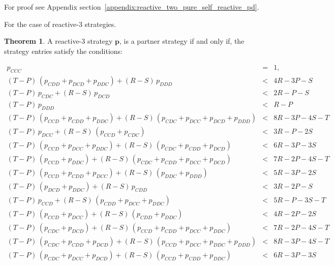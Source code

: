 \documentclass[11pt]{article}
\theoremstyle{definition}
\newtheorem{theorem}{Theorem}[section]
\begin{document}
For proof see Appendix section~\ref{appendix:reactive_two_pure_self_reactive_pd}.


For the case of reactive-3 strategies.

\begin{theorem}\label{theorem:reactive_three_partner_strategies_PD}
A reactive-3 strategy $\mathbf{p}$, is a partner strategy if and only if,
the strategy entries satisfy the conditions:

\begin{equation*}
  \begin{array}{ccc}
    p_{CCC} & = & 1, \\ [0.2cm]
    (T - P)\, (p_{CDD} + p_{DCD} + p_{DDC}) + (R - S)\, p_{DDD}  & < & 4 R - 3 P  - S \\ [0.2cm]
    (T - P)\, p_{CDC}  + (R - S)\, p_{DCD}  & < & 2 R - P  - S \\ [0.2cm]
    (T - P)\, p_{DDD} & < & R - P\\ [0.2cm]
    (T - P)\,(p_{CCD} + p_{CDD} + p_{DDC}) + (R - S)\,(p_{CDC} + p_{DCC} + p_{DCD} + p_{DDD}) & < & 8 R - 3 P - 4 S - T \\ [0.2cm]
    (T - P)\, p_{DCC}  + (R - S)\,(p_{CCD} + p_{CDC}) & < & 3 R - P - 2 S \\ [0.2cm]
    (T - P)\,(p_{CCD} + p_{DCC} + p_{DDC}) + (R - S)\,(p_{CDC} + p_{CDD} + p_{DCD}) & < & 6 R - 3 P - 3 S \\ [0.2cm]
    (T - P)\,(p_{CCD} + p_{DDC}) + (R - S)\,(p_{CDC} + p_{CDD} + p_{DCC} + p_{DCD}) & < & 7 R - 2 P - 4 S - T \\ [0.2cm]
    (T - P)\,(p_{CCD} + p_{CDD} + p_{DCC}) + (R - S)\,(p_{DDC} + p_{DDD}) & < & 5 R - 3 P - 2 S \\ [0.2cm]
    (T - P)\,(p_{DCD} + p_{DDC}) + (R - S)\, p_{CDD}  & < & 3 R - 2 P - S \\ [0.2cm] 
    (T - P)\, p_{CCD} + (R - S)\,(p_{CDD} + p_{DCC} + p_{DDC}) & < & 5 R - P - 3 S - T \\ [0.2cm]
    (T - P)\,(p_{CCD} + p_{DCC}) + (R - S)\,(p_{CDD} + p_{DDC}) & < & 4 R - 2 P - 2 S \\ [0.2cm]
    (T - P)\,(p_{CDC} + p_{DCD}) + (R - S)\,(p_{CCD} + p_{CDD} + p_{DCC} + p_{DDC}) & < & 7 R - 2 P - 4 S - T \\ [0.2cm]
    (T - P)\,(p_{CDC} + p_{CDD} + p_{DCD}) + (R - S)\,(p_{CCD} + p_{DCC} + p_{DDC} + p_{DDD}) & < & 8 R - 3 P - 4 S - T \\ [0.2cm]
    (T - P)\,(p_{CDC} + p_{DCC} + p_{DCD}) + (R - S)\,(p_{CCD} + p_{CDD} + p_{DDC}) & < & 6 R - 3 P - 3 S \\ [0.2cm]

\end{array}
\end{equation*}
\end{theorem}
\end{document}
